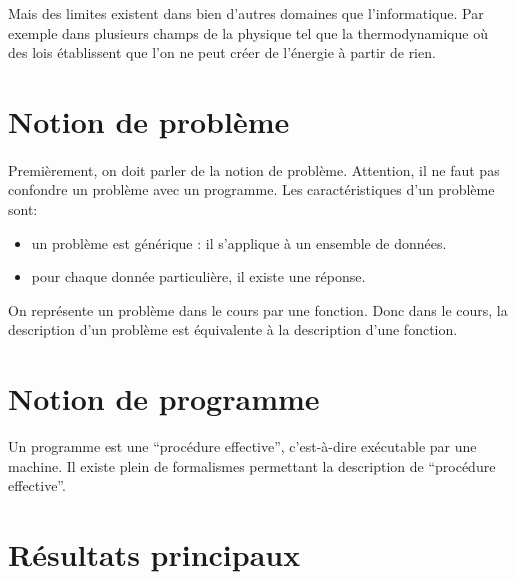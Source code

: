 Mais des limites existent dans bien d'autres domaines que l'informatique. 
Par exemple dans plusieurs champs de la physique tel que la 
thermodynamique où des lois établissent que l'on ne peut créer de l'énergie à partir de rien.


\section{Notion de problème}
\label{sec:notion_de_probl_me}

\paragraph{}
Premièrement, on doit parler de la notion de problème.
Attention, il ne faut pas confondre un problème avec un programme.
Les caractéristiques d'un problème sont:

\begin{itemize}
	\item un problème est générique : il s'applique à un ensemble de données.
	\item pour chaque donnée particulière, il existe une réponse.
\end{itemize}
On représente un problème dans le cours par une fonction. Donc dans le cours,
la description d'un problème est équivalente à la description d'une fonction.

\section{Notion de programme}
\label{sec:notion_de_programme}

Un programme est une ``procédure effective'', c'est-à-dire exécutable par une machine.
Il existe plein de formalismes permettant la description de ``procédure effective''.



\section{Résultats principaux}
\label{sec:r_sultat_principaux}

